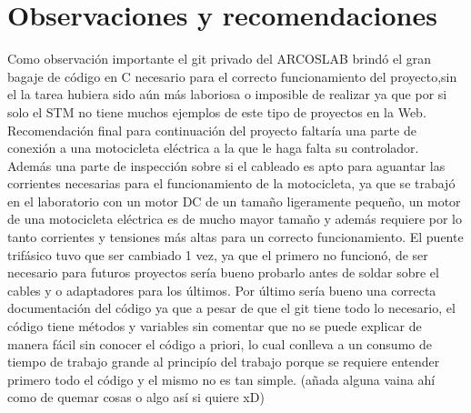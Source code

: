 \documentclass[letterpaper]{article}
\begin{document}
\section{Observaciones y recomendaciones}
Como observación importante el git privado del ARCOSLAB brindó el gran bagaje de código en C necesario para el correcto funcionamiento del proyecto,sin el la tarea hubiera sido aún más laboriosa o imposible de realizar
ya que por si solo el STM no tiene muchos ejemplos de este tipo de proyectos en la Web. 
Recomendación final para continuación del proyecto faltaría una parte de conexión a una motocicleta eléctrica a la que le haga falta su controlador.
Además una parte de inspección sobre si el cableado es apto para aguantar las corrientes necesarias para el funcionamiento de la motocicleta, ya que se trabajó en el laboratorio con un
motor DC de un tamaño ligeramente pequeño, un motor de una motocicleta eléctrica es de mucho mayor tamaño y además requiere por lo tanto corrientes y tensiones más altas para un correcto funcionamiento.
El puente trifásico tuvo que ser cambiado 1 vez, ya que el primero no funcionó, de ser necesario para futuros proyectos sería bueno probarlo antes de soldar sobre el cables y o adaptadores para los últimos.
Por último sería bueno una correcta documentación del código ya que a pesar de que el git tiene todo lo necesario, el código tiene métodos y variables sin comentar que no se puede explicar de manera fácil sin conocer el código a priori, lo cual
conlleva a un consumo de tiempo de trabajo grande al principío del trabajo porque se requiere entender primero todo el código y el mismo no es tan simple.
(añada alguna vaina ahí como de quemar cosas o algo así si quiere xD)


 

\end{document}
